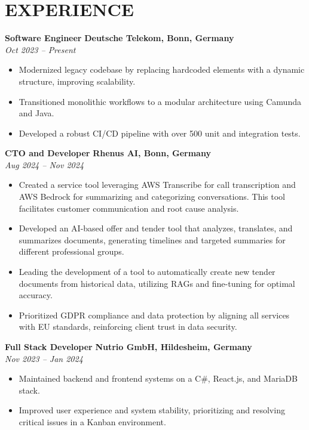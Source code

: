 \documentclass[a4paper,10pt]{article}
\begin{document}
\section*{\normalsize EXPERIENCE}
\textbf{Software Engineer} \hfill \textbf{Deutsche Telekom, Bonn, Germany} \\
\textit{Oct 2023 – Present}
\begin{itemize}[leftmargin=*,itemsep=0.3pt,topsep=2pt]
    \item Modernized legacy codebase by replacing hardcoded elements with a dynamic structure, improving scalability.
    \item Transitioned monolithic workflows to a modular architecture using Camunda and Java.
    \item Developed a robust CI/CD pipeline with over 500 unit and integration tests.
\end{itemize}
\vspace{2pt}
\textbf{CTO and Developer} \hfill \textbf{Rhenus AI, Bonn, Germany} \\
\textit{Aug 2024 – Nov 2024}
\begin{itemize}[leftmargin=*,itemsep=0.3pt,topsep=2pt]
    \item Created a service tool leveraging AWS Transcribe for call transcription and AWS Bedrock for summarizing and categorizing conversations. This tool facilitates customer communication and root cause analysis.
    \item Developed an AI-based offer and tender tool that analyzes, translates, and summarizes documents, generating timelines and targeted summaries for different professional groups.
    \item Leading the development of a tool to automatically create new tender documents from historical data, utilizing RAGs and fine-tuning for optimal accuracy.
    \item Prioritized GDPR compliance and data protection by aligning all services with EU standards, reinforcing client trust in data security.
\end{itemize}
\vspace{2pt}
\textbf{Full Stack Developer} \hfill \textbf{Nutrio GmbH, Hildesheim, Germany} \\
\textit{Nov 2023 – Jan 2024}
\begin{itemize}[leftmargin=*,itemsep=0.3pt,topsep=2pt]
    \item Maintained backend and frontend systems on a C\#, React.js, and MariaDB stack.
    \item Improved user experience and system stability, prioritizing and resolving critical issues in a Kanban environment.
\end{itemize}
\end{document}

